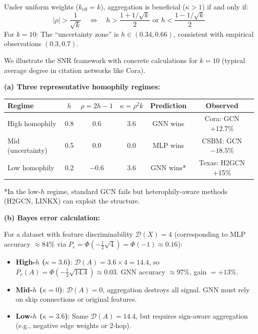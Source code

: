 \begin{corollary}
\label{cor:critical_threshold}
Under uniform weights ($k_{\mathrm{eff}} = k$), aggregation is beneficial ($\kappa > 1$) if and only if:
\begin{equation}
    |\rho| > \frac{1}{\sqrt{k}} \quad \Leftrightarrow \quad h > \frac{1 + 1/\sqrt{k}}{2} \text{ or } h < \frac{1 - 1/\sqrt{k}}{2}
\end{equation}
For $k = 10$: The ``uncertainty zone'' is $h \in (0.34, 0.66)$, consistent with empirical observations $(0.3, 0.7)$.
\end{corollary}



\begin{example}
\label{ex:numerical_illustration}
We illustrate the SNR framework with concrete calculations for $k = 10$ (typical average degree in citation networks like Cora).

\textbf{(a) Three representative homophily regimes:}

\begin{center}
\begin{tabular}{lccccc}
\toprule
\textbf{Regime} & $h$ & $\rho = 2h-1$ & $\kappa = \rho^2 k$ & \textbf{Prediction} & \textbf{Observed} \\
\midrule
High homophily & 0.8 & 0.6 & 3.6 & GNN wins & Cora: GCN +12.7\% \\
Mid (uncertainty) & 0.5 & 0.0 & 0.0 & MLP wins & CSBM: GCN $-18.5\%$ \\
Low homophily & 0.2 & $-0.6$ & 3.6 & GNN wins* & Texas: H2GCN +15\% \\
\bottomrule
\end{tabular}
\end{center}
*In the low-$h$ regime, standard GCN fails but heterophily-aware methods (H2GCN, LINKX) can exploit the structure.

\textbf{(b) Bayes error calculation:}

For a dataset with feature discriminability $\mathcal{D}(X) = 4$ (corresponding to MLP accuracy $\approx 84\%$ via $P_e = \Phi(-\frac{1}{2}\sqrt{4}) = \Phi(-1) \approx 0.16$):

\begin{itemize}
    \item \textbf{High-$h$ ($\kappa = 3.6$)}: $\mathcal{D}(A) = 3.6 \times 4 = 14.4$, so $P_e(A) = \Phi(-\frac{1}{2}\sqrt{14.4}) \approx 0.03$. GNN accuracy $\approx 97\%$, gain $= +13\%$.
    \item \textbf{Mid-$h$ ($\kappa = 0$)}: $\mathcal{D}(A) = 0$, aggregation destroys all signal. GNN must rely on skip connections or original features.
    \item \textbf{Low-$h$ ($\kappa = 3.6$)}: Same $\mathcal{D}(A) = 14.4$, but requires sign-aware aggregation (e.g., negative edge weights or 2-hop).
\end{itemize}


\end{example}
